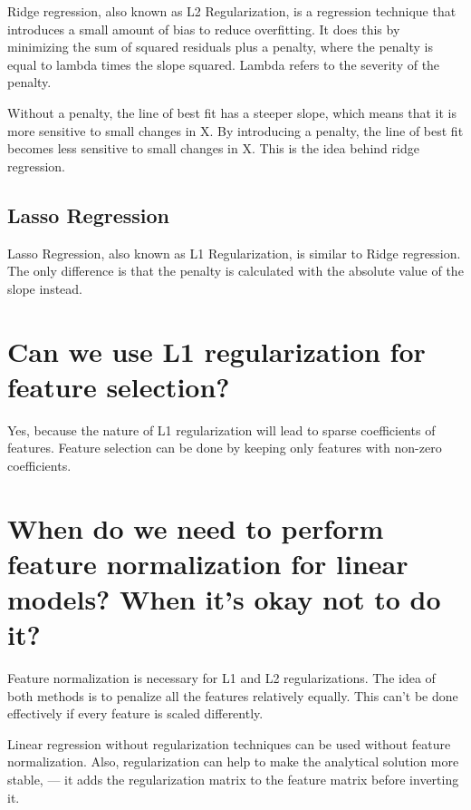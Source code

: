 \documentclass[
]{book}
\begin{document}
Ridge regression, also known as L2 Regularization, is a regression technique that introduces a small amount of bias to reduce overfitting. It does this by minimizing the sum of squared residuals plus a penalty, where the penalty is equal to lambda times the slope squared. Lambda refers to the severity of the penalty.

Without a penalty, the line of best fit has a steeper slope, which means that it is more sensitive to small changes in X. By introducing a penalty, the line of best fit becomes less sensitive to small changes in X. This is the idea behind ridge regression.

\hypertarget{lasso-regression}{%
\subsection{Lasso Regression}\label{lasso-regression}}

Lasso Regression, also known as L1 Regularization, is similar to Ridge regression. The only difference is that the penalty is calculated with the absolute value of the slope instead.

\hypertarget{can-we-use-l1-regularization-for-feature-selection}{%
\section{Can we use L1 regularization for feature selection?}\label{can-we-use-l1-regularization-for-feature-selection}}

Yes, because the nature of L1 regularization will lead to sparse coefficients of features. Feature selection can be done by keeping only features with non-zero coefficients.

\hypertarget{when-do-we-need-to-perform-feature-normalization-for-linear-models-when-its-okay-not-to-do-it}{%
\section{When do we need to perform feature normalization for linear models? When it's okay not to do it?}\label{when-do-we-need-to-perform-feature-normalization-for-linear-models-when-its-okay-not-to-do-it}}

Feature normalization is necessary for L1 and L2 regularizations. The idea of both methods is to penalize all the features relatively equally. This can't be done effectively if every feature is scaled differently.

Linear regression without regularization techniques can be used without feature normalization. Also, regularization can help to make the analytical solution more stable, --- it adds the regularization matrix to the feature matrix before inverting it.
\end{document}
